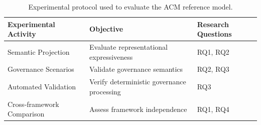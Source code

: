 \documentclass[10pt]{article}
\begin{document}
\begin{table}[ht]
\centering
\caption{Experimental protocol used to evaluate the ACM reference model.}
\label{tab:experimental_protocol}

\begin{tabular}{p{3.8cm}p{3.8cm}p{4.4cm}}
\toprule
\textbf{Experimental Activity} &
\textbf{Objective} &
\textbf{Research Questions} \\
\midrule

Semantic Projection &
Evaluate representational expressiveness &
RQ1, RQ2 \\

Governance Scenarios &
Validate governance semantics &
RQ2, RQ3 \\

Automated Validation &
Verify deterministic governance processing &
RQ3 \\

Cross-framework Comparison &
Assess framework independence &
RQ1, RQ4 \\

\bottomrule
\end{tabular}

\end{table}
\end{document}
